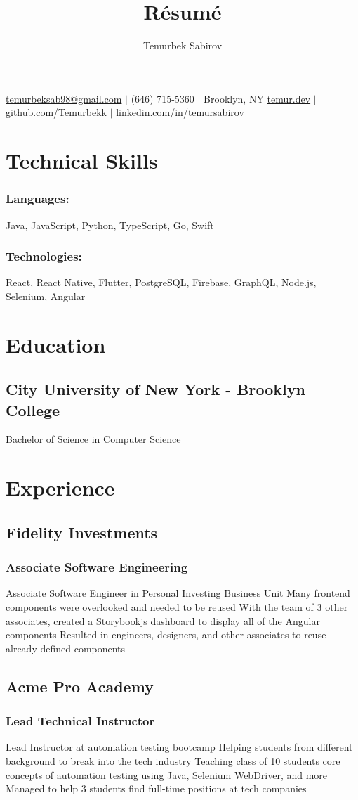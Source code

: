 \documentclass{article}
\makeatletter
\renewcommand{\maketitle}{
\begin{center}
{\LARGE\bfseries  
 
\theauthor}
\vspace{0.50em}
\break
\href{mailto:temurbeksab98@gmail.com}{temurbeksab98@gmail.com} $|$ (646) 715-5360 $|$ Brooklyn, NY
\vspace{0.25em}
\break
\href{http://www.temur.dev}{temur.dev} $|$ \href{http://github.com/Temurbekk}{github.com/Temurbekk} $|$ \href{http://linkedin.com/in/temursabirov}{linkedin.com/in/temursabirov}
\break
\vspace{-0.50em}
\end{center}
    
    }
\makeatother
\begin{document}
\title{R\'esum\'e}
\author{Temurbek Sabirov}

\maketitle

\section{Technical Skills}
\subsubsection{Languages:}
Java, JavaScript, Python, TypeScript, Go, Swift
\subsubsection{Technologies:}
React, React Native, Flutter, PostgreSQL, Firebase, GraphQL, Node.js, Selenium, Angular
\section{Education}
\subsection{City University of New York - Brooklyn College}
Bachelor of Science in Computer Science
\section{Experience}
\subsection{Fidelity Investments}
\subsubsection{Associate Software Engineering}
Associate Software Engineer in Personal Investing Business Unit
Many frontend components were overlooked and needed to be reused
With the team of 3 other associates, created a Storybookjs dashboard to display all of the Angular components
Resulted in engineers, designers, and other associates to reuse already defined components
\subsection{Acme Pro Academy}
\subsubsection{Lead Technical Instructor}
Lead Instructor at automation testing bootcamp
Helping students from different background to break into the tech industry
Teaching class of 10 students core concepts of automation testing using Java, Selenium WebDriver, and more
Managed to help 3 students find full-time positions at tech companies
\end{document}
